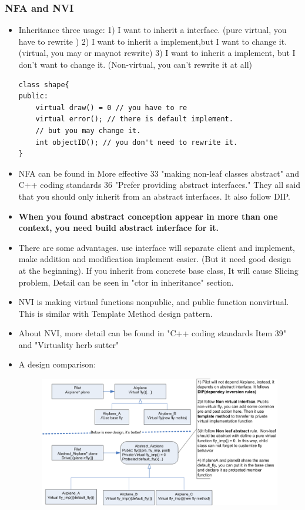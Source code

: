 \documentclass[a4paper,11pt,twoside]{book}
\begin{document}
\subsubsection{NFA and NVI}

\begin{itemize}

	\item Inheritance three usage: 1) I want to inherit a interface. (pure virtual, you have to rewrite ) 2) I want to inherit a implement,but I want to change it. (virtual, you may or maynot rewrite) 3) I want to inherit a implement, but I don't want to change it. (Non-virtual, you can't rewrite it at all)
\begin{lstlisting}[numbers=none]
class shape{
public:
	virtual draw() = 0 // you have to re
	virtual error(); // there is default implement.
	// but you may change it.
	int objectID(); // you don't need to rewrite it.
}
\end{lstlisting}

\item NFA can be found in More effective 33 "making non-leaf classes abstract" and C++ coding standards 36 "Prefer providing abstract interfaces." They all said that you should only inherit from an abstract interfaces. It also follow DIP.

\item \textbf{When you found abstract conception appear in more than one context, you need build abstract interface for it. }

\item There are some advantages. use interface will separate client and implement, make addition and modification implement easier. (But it need good design at the beginning). If you inherit from concrete base class, It will cause Slicing problem, Detail can be seen in "ctor in inheritance" section.

\item NVI is making virtual functions nonpublic, and public function nonvirtual. This is similar with Template Method design pattern.  

\item About NVI, more detail can be found in "C++ coding standards Item 39" and "Virtuality herb sutter"

\item A design comparison:
\begin{figure}
	\centering
	\includegraphics[width=0.8\linewidth]{pics/NVI.png}
	\caption{}
	\label{fig:nvi}
\end{figure}

\end{itemize}
\end{document}
